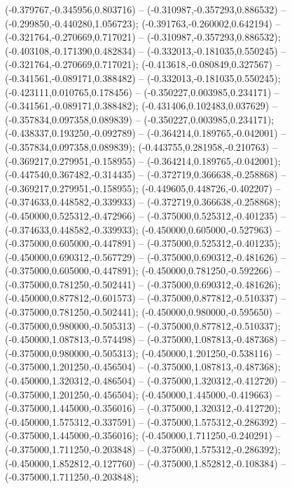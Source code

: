  (-0.379767,-0.345956,0.803716) -- (-0.310987,-0.357293,0.886532) -- (-0.299850,-0.440280,1.056723);
 (-0.391763,-0.260002,0.642194) -- (-0.321764,-0.270669,0.717021) -- (-0.310987,-0.357293,0.886532);
 (-0.403108,-0.171390,0.482834) -- (-0.332013,-0.181035,0.550245) -- (-0.321764,-0.270669,0.717021);
 (-0.413618,-0.080849,0.327567) -- (-0.341561,-0.089171,0.388482) -- (-0.332013,-0.181035,0.550245);
 (-0.423111,0.010765,0.178456) -- (-0.350227,0.003985,0.234171) -- (-0.341561,-0.089171,0.388482);
 (-0.431406,0.102483,0.037629) -- (-0.357834,0.097358,0.089839) -- (-0.350227,0.003985,0.234171);
 (-0.438337,0.193250,-0.092789) -- (-0.364214,0.189765,-0.042001) -- (-0.357834,0.097358,0.089839);
 (-0.443755,0.281958,-0.210763) -- (-0.369217,0.279951,-0.158955) -- (-0.364214,0.189765,-0.042001);
 (-0.447540,0.367482,-0.314435) -- (-0.372719,0.366638,-0.258868) -- (-0.369217,0.279951,-0.158955);
 (-0.449605,0.448726,-0.402207) -- (-0.374633,0.448582,-0.339933) -- (-0.372719,0.366638,-0.258868);
 (-0.450000,0.525312,-0.472966) -- (-0.375000,0.525312,-0.401235) -- (-0.374633,0.448582,-0.339933);
 (-0.450000,0.605000,-0.527963) -- (-0.375000,0.605000,-0.447891) -- (-0.375000,0.525312,-0.401235);
 (-0.450000,0.690312,-0.567729) -- (-0.375000,0.690312,-0.481626) -- (-0.375000,0.605000,-0.447891);
 (-0.450000,0.781250,-0.592266) -- (-0.375000,0.781250,-0.502441) -- (-0.375000,0.690312,-0.481626);
 (-0.450000,0.877812,-0.601573) -- (-0.375000,0.877812,-0.510337) -- (-0.375000,0.781250,-0.502441);
 (-0.450000,0.980000,-0.595650) -- (-0.375000,0.980000,-0.505313) -- (-0.375000,0.877812,-0.510337);
 (-0.450000,1.087813,-0.574498) -- (-0.375000,1.087813,-0.487368) -- (-0.375000,0.980000,-0.505313);
 (-0.450000,1.201250,-0.538116) -- (-0.375000,1.201250,-0.456504) -- (-0.375000,1.087813,-0.487368);
 (-0.450000,1.320312,-0.486504) -- (-0.375000,1.320312,-0.412720) -- (-0.375000,1.201250,-0.456504);
 (-0.450000,1.445000,-0.419663) -- (-0.375000,1.445000,-0.356016) -- (-0.375000,1.320312,-0.412720);
 (-0.450000,1.575312,-0.337591) -- (-0.375000,1.575312,-0.286392) -- (-0.375000,1.445000,-0.356016);
 (-0.450000,1.711250,-0.240291) -- (-0.375000,1.711250,-0.203848) -- (-0.375000,1.575312,-0.286392);
 (-0.450000,1.852812,-0.127760) -- (-0.375000,1.852812,-0.108384) -- (-0.375000,1.711250,-0.203848);

